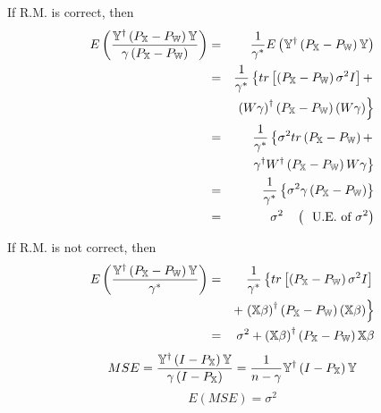 \documentclass{article}
\begin{document}
If R.M. is correct, then%
\begin{eqnarray*}
E\left( \frac{\mathbb{Y}^{\dagger }\left( P_{\mathbb{X}}-P_{\mathbb{W}%
}\right) \mathbb{Y}}{\mathbb{\gamma }\left( P_{\mathbb{X}}-P_{\mathbb{W}%
}\right) }\right) &=&\frac{1}{\gamma ^{\ast }}E\left( \mathbb{Y}^{\dagger
}\left( P_{\mathbb{X}}-P_{\mathbb{W}}\right) \mathbb{Y}\right) \\
&=&\frac{1}{\gamma ^{\ast }}\left\{ tr\left[ \left( P_{\mathbb{X}}-P_{%
\mathbb{W}}\right) \sigma ^{2}I\right] +\right. \\
&&\left. \left( W\gamma \right) ^{\dagger }\left( P_{\mathbb{X}}-P_{\mathbb{W%
}}\right) \left( W\gamma \right) \right\} \\
&=&\frac{1}{\gamma ^{\ast }}\left\{ \sigma ^{2}tr\left( P_{\mathbb{X}}-P_{%
\mathbb{W}}\right) +\right. \\
&&\left. \gamma ^{\dagger }W^{\dagger }\left( P_{\mathbb{X}}-P_{\mathbb{W}%
}\right) W\gamma \right\} \\
&=&\frac{1}{\gamma ^{\ast }}\left\{ \sigma ^{2}\gamma \left( P_{\mathbb{X}%
}-P_{\mathbb{W}}\right) \right\} \\
&=&\sigma ^{2}\quad \left( \text{U.E. of }\sigma ^{2}\right)
\end{eqnarray*}

\bigskip

If R.M. is not correct, then%
\begin{eqnarray*}
E\left( \frac{\mathbb{Y}^{\dagger }\left( P_{\mathbb{X}}-P_{\mathbb{W}%
}\right) \mathbb{Y}}{\mathbb{\gamma }^{\ast }}\right) &=&\frac{1}{\gamma
^{\ast }}\left\{ tr\left[ \left( P_{\mathbb{X}}-P_{\mathbb{W}}\right) \sigma
^{2}I\right] \right. \\
&&+\left. \left( \mathbb{X}\beta \right) ^{\dagger }\left( P_{\mathbb{X}}-P_{%
\mathbb{W}}\right) \left( \mathbb{X}\beta \right) \right\} \\
&=&\sigma ^{2}+\left( \mathbb{X}\beta \right) ^{\dagger }\left( P_{\mathbb{X}%
}-P_{\mathbb{W}}\right) \mathbb{X}\beta
\end{eqnarray*}%
\begin{equation*}
MSE=\frac{\mathbb{Y}^{\dagger }\left( I-P_{\mathbb{X}}\right) \mathbb{Y}}{%
\mathbb{\gamma }\left( I-P_{\mathbb{X}}\right) }=\frac{1}{n-\gamma }\mathbb{Y%
}^{\dagger }\left( I-P_{\mathbb{X}}\right) \mathbb{Y}
\end{equation*}%
\begin{equation*}
E\left( MSE\right) =\sigma ^{2}
\end{equation*}
\end{document}
